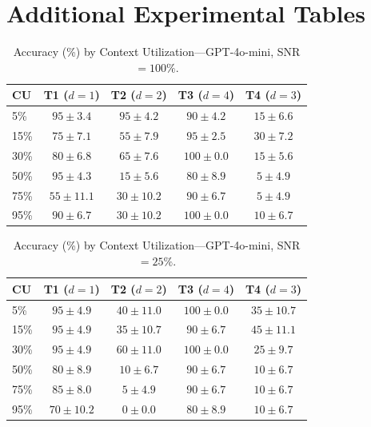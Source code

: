 \documentclass{article}
\begin{document}
\section{Additional Experimental Tables}
\label{app:tables}

\begin{table}[h]
\centering
\small
\caption{Accuracy (\%) by Context Utilization---GPT-4o-mini, SNR${=}100\%$.}
\label{tab:mini_snr100}
\begin{tabular}{@{}lcccc@{}}
\toprule
CU & T1 ($d{=}1$) & T2 ($d{=}2$) & T3 ($d{=}4$) & T4 ($d{=}3$) \\
\midrule
5\%  & $95 \pm 3.4$ & $95 \pm 4.2$ & $90 \pm 4.2$ & $15 \pm 6.6$ \\
15\% & $75 \pm 7.1$ & $55 \pm 7.9$ & $95 \pm 2.5$ & $30 \pm 7.2$ \\
30\% & $80 \pm 6.8$ & $65 \pm 7.6$ & $100 \pm 0.0$ & $15 \pm 5.6$ \\
50\% & $95 \pm 4.3$ & $15 \pm 5.6$ & $80 \pm 8.9$ & $5 \pm 4.9$ \\
75\% & $55 \pm 11.1$ & $30 \pm 10.2$ & $90 \pm 6.7$ & $5 \pm 4.9$ \\
95\% & $90 \pm 6.7$ & $30 \pm 10.2$ & $100 \pm 0.0$ & $10 \pm 6.7$ \\
\bottomrule
\end{tabular}
\end{table}

\begin{table}[h]
\centering
\small
\caption{Accuracy (\%) by Context Utilization---GPT-4o-mini, SNR${=}25\%$.}
\label{tab:mini_snr25}
\begin{tabular}{@{}lcccc@{}}
\toprule
CU & T1 ($d{=}1$) & T2 ($d{=}2$) & T3 ($d{=}4$) & T4 ($d{=}3$) \\
\midrule
5\%  & $95 \pm 4.9$ & $40 \pm 11.0$ & $100 \pm 0.0$ & $35 \pm 10.7$ \\
15\% & $95 \pm 4.9$ & $35 \pm 10.7$ & $90 \pm 6.7$ & $45 \pm 11.1$ \\
30\% & $95 \pm 4.9$ & $60 \pm 11.0$ & $100 \pm 0.0$ & $25 \pm 9.7$ \\
50\% & $80 \pm 8.9$ & $10 \pm 6.7$ & $90 \pm 6.7$ & $10 \pm 6.7$ \\
75\% & $85 \pm 8.0$ & $5 \pm 4.9$ & $90 \pm 6.7$ & $10 \pm 6.7$ \\
95\% & $70 \pm 10.2$ & $0 \pm 0.0$ & $80 \pm 8.9$ & $10 \pm 6.7$ \\
\bottomrule
\end{tabular}
\end{table}
\end{document}
